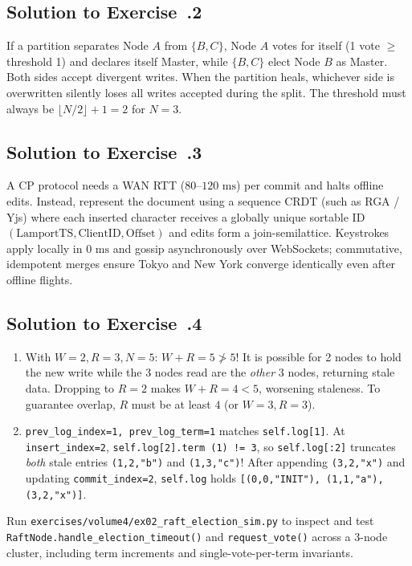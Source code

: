 \subsection*{Solution to Exercise~\thechapter.2}
If a partition separates Node $A$ from $\{B, C\}$, Node $A$ votes for itself (1 vote $\ge$ threshold 1) and declares itself Master, while $\{B, C\}$ elect Node $B$ as Master. Both sides accept divergent writes. When the partition heals, whichever side is overwritten silently loses all writes accepted during the split. The threshold must always be $\lfloor N/2 \rfloor + 1 = 2$ for $N=3$.

\subsection*{Solution to Exercise~\thechapter.3}
A CP protocol needs a WAN RTT ($80\text{--}120\text{ ms}$) per commit and halts offline edits. Instead, represent the document using a sequence CRDT (such as RGA / Yjs) where each inserted character receives a globally unique sortable ID $(\text{LamportTS}, \text{ClientID}, \text{Offset})$ and edits form a join-semilattice. Keystrokes apply locally in $0\text{ ms}$ and gossip asynchronously over WebSockets; commutative, idempotent merges ensure Tokyo and New York converge identically even after offline flights.

\subsection*{Solution to Exercise~\thechapter.4}
\begin{enumerate}[leftmargin=18pt]
  \item With $W=2, R=3, N=5$: $W + R = 5 \not> 5$! It is possible for 2 nodes to hold the new write while the 3 nodes read are the \emph{other} 3 nodes, returning stale data. Dropping to $R=2$ makes $W + R = 4 < 5$, worsening staleness. To guarantee overlap, $R$ must be at least $4$ (or $W=3, R=3$).
  \item \texttt{prev\_log\_index=1, prev\_log\_term=1} matches \texttt{self.log[1]}. At \texttt{insert\_index=2}, \texttt{self.log[2].term (1) != 3}, so \texttt{self.log[:2]} truncates \emph{both} stale entries \texttt{(1,2,"b")} and \texttt{(1,3,"c")}! After appending \texttt{(3,2,"x")} and updating \texttt{commit\_index=2}, \texttt{self.log} holds \texttt{[(0,0,"INIT"), (1,1,"a"), (3,2,"x")]}.
\end{enumerate}

\begin{labbridgebox}
Run \texttt{exercises/volume4/ex02\_raft\_election\_sim.py} to inspect and test \texttt{RaftNode.handle\_election\_timeout()} and \texttt{request\_vote()} across a 3-node cluster, including term increments and single-vote-per-term invariants.
\end{labbridgebox}

